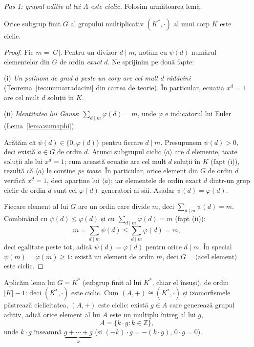 \begin{solutie}
\textit{Pas 1: grupul aditiv al lui $A$ este ciclic.} Folosim următoarea
lemă.

\begin{lemat}
Orice subgrup finit $G$ al grupului multiplicativ $(K^{*},\cdot)$ al unui
corp $K$ este ciclic.
\end{lemat}

\begin{proof}
Fie $m=|G|$. Pentru un divizor $d\mid m$, notăm cu $\psi(d)$ numărul
elementelor din $G$ de ordin \emph{exact} $d$. Ne sprijinim pe două
fapte:

(i) \emph{Un polinom de grad $d$ peste un corp are cel mult $d$
rădăcini} (Teorema~\ref{teo:numarradacini} din cartea de teorie). În particular,
ecuația $x^{d}=1$ are cel mult $d$ soluții în $K$.

(ii) \emph{Identitatea lui Gauss}: $\sum_{d\mid m}\varphi(d)=m$, unde
$\varphi$ e indicatorul lui Euler (Lema~\ref{lema:sumaphi}).

Arătăm că $\psi(d)\in\{0,\varphi(d)\}$ pentru fiecare $d\mid m$.
Presupunem $\psi(d)>0$, deci există $a\in G$ de ordin $d$. Atunci
subgrupul ciclic $\langle a\rangle$ are $d$ elemente, toate soluții ale
lui $x^{d}=1$; cum această ecuație are cel mult $d$ soluții în
$K$ (fapt (i)), rezultă că $\langle a\rangle$ le conține
\emph{pe toate}. În particular, orice element din $G$ de ordin $d$
verifică $x^{d}=1$, deci aparține lui $\langle a\rangle$; iar
elementele de ordin exact $d$ dintr-un grup ciclic de ordin $d$ sunt cei
$\varphi(d)$ generatori ai săi. Așadar $\psi(d)=\varphi(d)$.

Fiecare element al lui $G$ are un ordin care divide $m$, deci
$\sum_{d\mid m}\psi(d)=m$. Combinând cu $\psi(d)\le\varphi(d)$ și cu
$\sum_{d\mid m}\varphi(d)=m$ (fapt (ii)):
\[
  m=\sum_{d\mid m}\psi(d)\le\sum_{d\mid m}\varphi(d)=m,
\]
deci egalitate peste tot, adică $\psi(d)=\varphi(d)$ pentru orice
$d\mid m$. În special $\psi(m)=\varphi(m)\ge 1$: există un element de
ordin $m$, deci $G=\langle\text{acel element}\rangle$ este ciclic.
\end{proof}

Aplicăm lema lui $G=K^{*}$ (subgrup finit al lui $K^{*}$, chiar el
însuși), de ordin $|K|-1$: deci $(K^{*},\cdot)$ este ciclic. Cum
$(A,+)\cong(K^{*},\cdot)$ și izomorfismele păstrează
ciclicitatea, $(A,+)$ este ciclic: există $g\in A$ care generează
grupul aditiv, adică orice element al lui $A$ este un multiplu
întreg al lui $g$,
\[
  A=\{k\cdot g : k\in\mathbb{Z}\},
\]
unde $k\cdot g$ înseamnă $\underbrace{g+\cdots+g}_{k}$ (și
$(-k)\cdot g=-(k\cdot g)$, $0\cdot g=0$).


\end{solutie}
